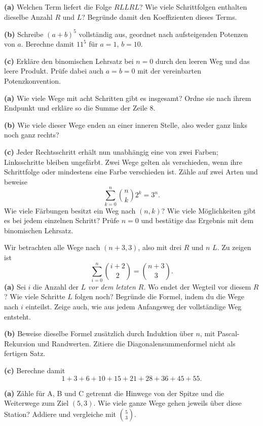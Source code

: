 \textbf{(a)} Welchen Term liefert die Folge $RLLRL$? Wie viele
Schrittfolgen enthalten dieselbe Anzahl $R$ und $L$? Begründe damit
den Koeffizienten dieses Terms.

\textbf{(b)} Schreibe $(a+b)^5$ vollständig aus, geordnet nach
aufsteigenden Potenzen von $a$. Berechne damit $11^5$ für $a=1$, $b=10$.

\textbf{(c)} Erkläre den binomischen Lehrsatz bei $n=0$ durch den
leeren Weg und das leere Produkt. Prüfe dabei auch $a=b=0$ mit der
vereinbarten Potenzkonvention.

\textbf{(a)} Wie viele Wege mit acht Schritten gibt es insgesamt?
Ordne sie nach ihrem Endpunkt und erkläre so die Summe der Zeile $8$.

\textbf{(b)} Wie viele dieser Wege enden an einer inneren Stelle,
also weder ganz links noch ganz rechts?

\textbf{(c)} Jeder Rechtsschritt erhält nun unabhängig eine von zwei
Farben; Linksschritte bleiben ungefärbt. Zwei Wege gelten als verschieden,
wenn ihre Schrittfolge oder mindestens eine Farbe verschieden ist.
Zähle auf zwei Arten und beweise
\[
 \sum_{k=0}^n\binom nk2^k=3^n.
\]
Wie viele Färbungen besitzt ein Weg nach $(n,k)$? Wie viele Möglichkeiten
gibt es bei jedem einzelnen Schritt? Prüfe $n=0$ und bestätige das
Ergebnis mit dem binomischen Lehrsatz.

Wir betrachten alle Wege nach $(n+3,3)$, also mit drei $R$ und $n$ $L$.
Zu zeigen ist
\[
 \sum_{i=0}^n\binom{i+2}2=\binom{n+3}3.
\]
\textbf{(a)} Sei $i$ die Anzahl der $L$ \emph{vor dem letzten $R$}.
Wo endet der Wegteil vor diesem $R$? Wie viele Schritte $L$ folgen
noch? Begründe die Formel, indem du die Wege nach $i$ einteilst.
Zeige auch, wie aus jedem Anfangsweg der vollständige Weg entsteht.

\textbf{(b)} Beweise dieselbe Formel zusätzlich durch Induktion über $n$,
mit Pascal-Rekursion und Randwerten. Zitiere die Diagonalensummenformel
nicht als fertigen Satz.

\textbf{(c)} Berechne damit
\[
 1+3+6+10+15+21+28+36+45+55.
\]

\begin{center}\PascalAufgabeSchnitt\end{center}
\textbf{(a)} Zähle für A, B und C getrennt die Hinwege von der Spitze
und die Weiterwege zum Ziel $(5,3)$. Wie viele ganze Wege gehen
jeweils über diese Station? Addiere und vergleiche mit $\binom53$.

